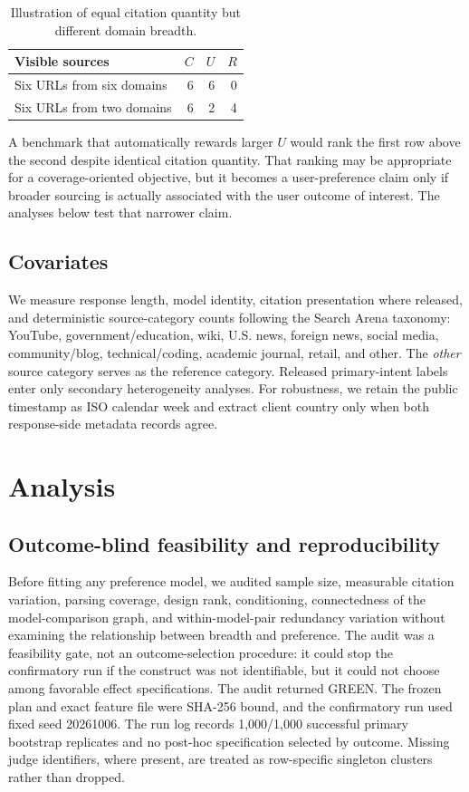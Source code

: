 \documentclass[sigconf,natbib=true,anonymous=true]{acmart}
\begin{document}
\begin{table}[t]
\centering
\caption{Illustration of equal citation quantity but different domain breadth.}
\label{tab:construct}
\small
\begin{tabular}{lrrr}
\toprule
Visible sources & $C$ & $U$ & $R$ \\
\midrule
Six URLs from six domains & 6 & 6 & 0 \\
Six URLs from two domains & 6 & 2 & 4 \\
\bottomrule
\end{tabular}
\end{table}

A benchmark that automatically rewards larger $U$ would rank the first row above the second despite identical citation quantity. That ranking may be appropriate for a coverage-oriented objective, but it becomes a user-preference claim only if broader sourcing is actually associated with the user outcome of interest. The analyses below test that narrower claim.

\subsection{Covariates}
We measure response length, model identity, citation presentation where released, and deterministic source-category counts following the Search Arena taxonomy: YouTube, government/education, wiki, U.S. news, foreign news, social media, community/blog, technical/coding, academic journal, retail, and other. The \textit{other} source category serves as the reference category. Released primary-intent labels enter only secondary heterogeneity analyses. For robustness, we retain the public timestamp as ISO calendar week and extract client country only when both response-side metadata records agree.

\section{Analysis}
\subsection{Outcome-blind feasibility and reproducibility}
Before fitting any preference model, we audited sample size, measurable citation variation, parsing coverage, design rank, conditioning, connectedness of the model-comparison graph, and within-model-pair redundancy variation without examining the relationship between breadth and preference. The audit was a feasibility gate, not an outcome-selection procedure: it could stop the confirmatory run if the construct was not identifiable, but it could not choose among favorable effect specifications. The audit returned GREEN. The frozen plan and exact feature file were SHA-256 bound, and the confirmatory run used fixed seed 20261006. The run log records 1,000/1,000 successful primary bootstrap replicates and no post-hoc specification selected by outcome. Missing judge identifiers, where present, are treated as row-specific singleton clusters rather than dropped.
\end{document}
